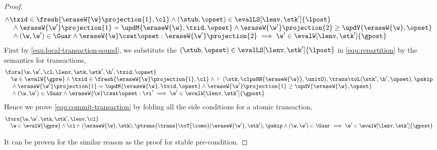 \begin{proof}
\begin{equation}
\begin{array}{@{}l}
    \land \txid \in \fresh{\eraseW{\w}\projection{1}, \cl} 
    \land (\stub,\opset) \in \evalLS[\lenv, \stk']{\lpost} \\
    \quad {} \land \eraseW{\w'}\projection{1} = \updM{\eraseW{\w}, \txid, \opset}  
    \land \eraseW{\w'}\projection{2} \geq \updV{\eraseW{\w}, \opset} \\
    \quad {} \land (\w, \w') \in \Guar 
    \land \eraseW{\w} \csat \opset : \eraseW{\w'}\projection{2} 
    \implies \w' \in \evalW[\lenv, \stk']{\gpost}
\end{array}
\end{equation}
First by \cref{equ:local-transaction-sound}, we substitute the \( (\stub, \opset) \in \evalLS[\lenv, \stk']{\lpost}\) in \cref{equ:repartition} by the semantics for transactions,
\begin{equation}
\label{equ:combined-transaction-sound}
\begin{array}{@{}l}
    \fora{\w, \w', \cl, \lenv, \stk, \stk', \h', \txid, \opset} \\
    \quad \w \in \evalW{\gpre}
    \land \txid \in \fresh{\eraseW{\w}\projection{1}, \cl} 
    \land {} \vdash (\stk, \clpsHH{\eraseW{\w}}, \unitO), \trans \toL (\stk', \h', \opset), \pskip  \\
    \quad {} \land \eraseW{\w'}\projection{1} = \updM{\eraseW{\w}, \txid, \opset}  
    \land \eraseW{\w'}\projection{1} \geq \updV{\eraseW{\w}, \opset} \\
    \quad {} \land (\w, \w') \in \Guar 
    \land \eraseW{\w} \csat \opset : \vi' 
    \implies \w' \in \evalW[\lenv, \stk']{\gpost}
\end{array}
\end{equation}
Hence we prove \cref{equ:commit-transaction} by folding all the side conditions for a atomic transaction,
\[
\begin{array}{@{}l}
    \fora{\w, \w', \stk, \stk', \lenv, \cl} \\
    \quad \w \in \evalW{\gpre}
    \land {} \cl \vdash (\eraseW{\w}, \stk), \ptrans{\trans} \toT{\como} (\eraseW{\w'}, \stk'), \pskip
    \land (\w, \w') \in \Guar 
    \implies \w' \in \evalW[\lenv, \stk']{\gpost}
\end{array}
\]

It can be proven for the similar reason as the proof for stable pre-condition.


\end{proof}
